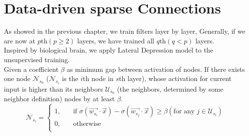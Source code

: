 \documentclass[conference]{IEEEtran}
\begin{document}
\section{Data-driven sparse Connections}
As showed in the previous chapter, we train filters layer by layer,
Generally, if we are now at $p\text{th}(p\ge2)$ layers, we have trained all
$q\text{th}(q<p)$ layers.\\
  Inspired by biological brain, we apply Lateral Depression model to the unsupervised
training.\\
Given a coefficient $\beta$ as minimum gap between activation of nodes.
If there exists one node $\mathcal{N}_{s_0}$ ($\mathcal{N}_{s_i}$ is the $i$th node
in $s$th layer), whose activation for current input is higher than its neighbors $\mathcal{U}_{s_0}$
(the neighbors, determined by some neighbor definition) nodes by at least $\beta$.
\begin{equation}
\mathcal{N}_{s_i} =\left\{
\begin{aligned}
1,&\quad \text{if }\sigma\left(\vec{w_{s_i}}\cdot\vec{x}\right) -
\sigma\left(\vec{w_{s_j}}\cdot\vec{x}\right) \ge \beta
(\text{for any }j\in \mathcal{U}_{s_i})  \\
0,&\quad \text{otherwise}\\
\end{aligned}
\right.
\end{equation}


%
%

\end{document}
